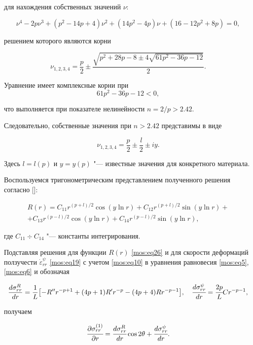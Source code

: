 для нахождения собственных значений $\nu$:

$$\nu^4-2p\nu^3+(p^2-14p+4)\nu^2+(14p^2-4p)\nu+(16-12p^2+8p)=0, $$

решением которого являются корни

$$\nu_{1,2,3,4}=\frac p2\pm\frac{\sqrt{p^2+28p-8\pm4\sqrt{61p^2-36p-12}}}{2}.$$

Уравнение имеет комплексные корни при $$61p^2-36p-12<0,$$ 

что выполняется  при показателе нелинейности $n=2/p>2.42$. 

Следовательно, собственные значения  при $n>2.42$ представимы в виде

$$\nu_{1,2,3,4}=\frac p2\pm\frac l2\pm iy .$$

Здесь $l=l(p)$  и  $y=y(p)$ "--- известные значения для конкретного материала.

Воспользуемся тригонометрическим представлением полученного решения согласно []:

\begin{multline}

\label{mos:eq26}

R(r)=C_{11} r^{(p+l)/2}\cos(y\ln r)+C_{12} r^{(p+l)/2}\sin(y\ln r)+\\+C_{13} r^{(p-l)/2}\cos(y\ln r)+C_{14} r^{(p-l)/2}\sin(y\ln r),

\end{multline}

где $C_{11}\div C_{14}$  "--- константы интегрирования.



Подставляя решения для функции $R(r)$  \eqref{mos:eq26}  и для скорости деформаций ползучести $ \dot{\varepsilon}_{rr} ^{\psi}$ \eqref{mos:eq19} с учетом  \eqref{mos:eq10} в уравнения равновесия \eqref{mos:eq5},  \eqref{mos:eq6} и обозначая

\begin{equation*}

\frac{d\sigma_{rr}^R}{dr}=\frac1L\bigl[-R'' r^{-p+1}+(4p+1)R' r^{-p}-(4p+4)Rr^{-p-1}\bigr] ,

\quad 

\cfrac{d\sigma_{rr}^\psi}{dr}=\cfrac{2p}LCr^{-p-1} ,

\end{equation*}

получаем

$$\cfrac{\partial\sigma_{rr}^{(1)}}{\partial r}=\cfrac{d\sigma_{rr}^R}{dr}\cos{2\theta}+\cfrac{d\sigma_{rr}^\psi}{dr}.$$

